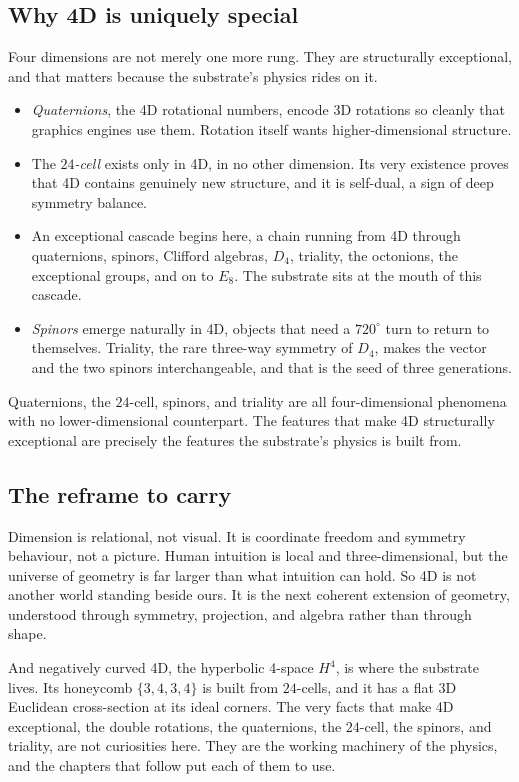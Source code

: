 \subsection{Why 4D is uniquely special}

Four dimensions are not merely one more rung. They are structurally exceptional, and that matters because the substrate's physics rides on it.

\begin{itemize}
  \item \emph{Quaternions}, the 4D rotational numbers, encode 3D rotations so cleanly that graphics engines use them. Rotation itself wants higher-dimensional structure.
  \item The \emph{$24$-cell} exists only in 4D, in no other dimension. Its very existence proves that 4D contains genuinely new structure, and it is self-dual, a sign of deep symmetry balance.
  \item An exceptional cascade begins here, a chain running from 4D through quaternions, spinors, Clifford algebras, $D_4$, triality, the octonions, the exceptional groups, and on to $E_8$. The substrate sits at the mouth of this cascade.
  \item \emph{Spinors} emerge naturally in 4D, objects that need a $720^\circ$ turn to return to themselves. Triality, the rare three-way symmetry of $D_4$, makes the vector and the two spinors interchangeable, and that is the seed of three generations.
\end{itemize}

\begin{result}
Quaternions, the $24$-cell, spinors, and triality are all four-dimensional phenomena with no lower-dimensional counterpart. The features that make 4D structurally exceptional are precisely the features the substrate's physics is built from.
\end{result}

\subsection{The reframe to carry}

Dimension is relational, not visual. It is coordinate freedom and symmetry behaviour, not a picture. Human intuition is local and three-dimensional, but the universe of geometry is far larger than what intuition can hold. So 4D is not another world standing beside ours. It is the next coherent extension of geometry, understood through symmetry, projection, and algebra rather than through shape.

And negatively curved 4D, the hyperbolic 4-space $H^4$, is where the substrate lives. Its honeycomb $\{3,4,3,4\}$ is built from $24$-cells, and it has a flat 3D Euclidean cross-section at its ideal corners. The very facts that make 4D exceptional, the double rotations, the quaternions, the $24$-cell, the spinors, and triality, are not curiosities here. They are the working machinery of the physics, and the chapters that follow put each of them to use.
